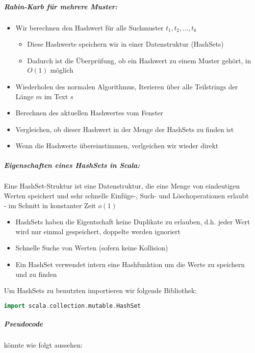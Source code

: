\subparagraph{Rabin-Karb für mehrere Muster:}\cite{Stackoverflow-Rabin-Karp}\cite{Java-HashSet}
\begin{itemize}
	\item Wir berechnen den Hashwert für alle Suchmuster $t_1,t_2, \dots, t_k$
	\begin{itemize}
		\item Diese Hashwerte speichern wir in einer Datenstruktur (HashSets)
		\item Dadurch ist die Überprüfung, ob ein Hashwert zu einem Muster gehört, in $O(1)$ möglich
	\end{itemize}
	\item Wiederholen des normalen Algorithmus, Iterieren über alle Teilstrings der Länge $m$ im Text $s$
	\item Berechnen des aktuellen Hashwertes vom Fenster
	\item Vergleichen, ob dieser Hashwert in der Menge der HashSets zu finden ist
	\item Wenn die Hashwerte übereinstimmen, verlgeichen wir wieder direkt
\end{itemize}

\subparagraph{Eigenschaften eines HashSets in Scala:}

Eine HashSet-Struktur ist eine Datenstruktur, die eine Menge von eindeutigen Werten speichert und sehr schnelle Einfüge-, Such- und Löschoperationen erlaubt - im Schnitt in konstanter Zeit $o(1)$

\begin{itemize}
	\item HashSets haben die Eigentschaft keine Duplikate zu erlauben, d.h. jeder Wert wird nur einmal gespeichert, doppelte werden ignoriert
	\item Schnelle Suche von Werten (sofern keine Kollision)
	\item Ein HashSet verwendet intern eine Hashfunktion um die Werte zu speichern und zu finden
\end{itemize}

\noindent
Um HashSets zu benutzten importieren wir folgende Bibliothek:
\begin{lstlisting}[language=Scala]
import scala.collection.mutable.HashSet
\end{lstlisting}

\subparagraph{Pseudocode} könnte wie folgt aussehen:

